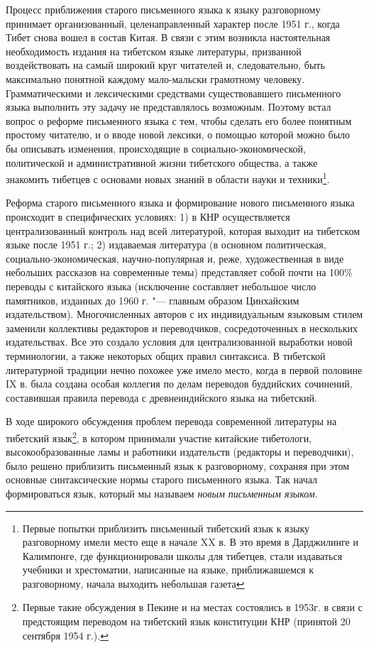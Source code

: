 Процесс приближения старого письменного языка к языку разговорному принимает организованный, целенаправленный характер после 1951 г., когда Тибет снова вошел в состав Китая. В связи с этим возникла настоятельная необходимость издания на тибетском языке литературы, призванной воздействовать на самый широкий круг читателей и, следовательно, быть максимально понятной каждому мало-мальски грамотному человеку. Грамматическими и лексическими средствами существовавшего письменного языка выполнить эту задачу не представлялось возможным. Поэтому встал вопрос о реформе письменного языка с тем, чтобы сделать его более понятным простому читателю, и о вводе новой лексики, о помощью которой можно было бы описывать изменения, происходящие в социально-экономической, политической и административной жизни тибетского общества, а также знакомить тибетцев с основами новых знаний в области науки и техники\footnote[5]{Первые попытки приблизить письменный тибетский язык к языку разговорному имели место еще в начале XX в. В это время в Дарджилинге и Калимпонге, где функционировали школы для тибетцев, стали издаваться учебники и хрестоматии, написанные на языке, приближавшемся к разговорному, начала выходить небольшая газета}.

Реформа старого письменного языка и формирование нового письменного языка происходит в специфических условиях: 1) в КНР осуществляется централизованный контроль над всей литературой, которая выходит на тибетском языке после 1951 г.; 2) издаваемая литература (в основном политическая, социально-экономическая, научно-популярная и, реже, художественная в виде небольших рассказов на современные темы) представляет собой почти на 100\% переводы с китайского языка (исключение составляет небольшое число памятников, изданных до 1960 г. "--- главным образом Цинхайским издательством). Многочисленных авторов с их индивидуальным языковым стилем заменили коллективы редакторов и переводчиков, сосредоточенных в нескольких издательствах. Все это создало условия для централизованной выработки новой терминологии, а также некоторых общих правил синтаксиса. В тибетской литературной традиции нечно похожее уже имело место, когда в первой половине IX в. была создана особая коллегия по делам переводов буддийских сочинений, составившая правила перевода с древнеиндийского языка на тибетский.

В ходе широкого обсуждения проблем перевода современной литературы на тибетский язык\footnote[6]{Первые такие обсуждения в Пекине и на местах состоялись в 1953г. в связи с предстоящим переводом на тибетский язык конституции КНР (принятой 20 сентября 1954 г.).}, в котором принимали участие китайские тибетологи, высокообразованные ламы и работники издательств (редакторы и переводчики), было решено приблизить письменный язык к разговорному, сохраняя при этом основные синтаксические нормы старого письменного языка. Так начал формироваться язык, который мы называем \emph{новым письменным языком}.

